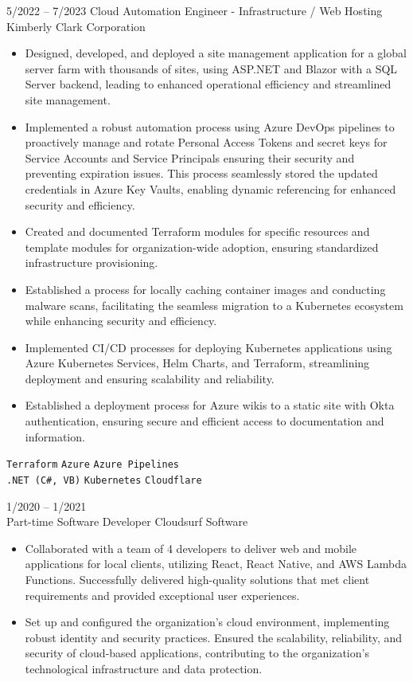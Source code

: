 \documentclass[9pt]{developercv} %
\begin{document}
\begin{entrylist}
	\entry
		{5/2022 -- 7/2023}
		{Cloud Automation Engineer - Infrastructure / Web Hosting}
		{Kimberly Clark Corporation}
		{\vspace{-10pt}
        \begin{itemize}[noitemsep,topsep=0pt,parsep=0pt,partopsep=0pt, leftmargin=-1pt]
            \item Designed, developed, and deployed a site management application for a global server farm with thousands of sites, using ASP.NET and Blazor with a SQL Server backend, leading to enhanced operational efficiency and streamlined site management.
            \item Implemented a robust automation process using Azure DevOps pipelines to proactively manage and rotate Personal Access Tokens and secret keys for Service Accounts and Service Principals ensuring their security and preventing expiration issues. This process seamlessly stored the updated credentials in Azure Key Vaults, enabling dynamic referencing for enhanced security and efficiency.
            \item Created and documented Terraform modules for specific resources and template modules for organization-wide adoption, ensuring standardized infrastructure provisioning.
            \item  Established a process for locally caching container images and conducting malware scans, facilitating the seamless migration to a Kubernetes ecosystem while enhancing security and efficiency.
            \item Implemented CI/CD processes for deploying Kubernetes applications using Azure Kubernetes Services, Helm Charts, and Terraform, streamlining deployment and ensuring scalability and reliability.
            \item Established a deployment process for Azure wikis to a static site with Okta authentication, ensuring secure and efficient access to documentation and information.
        \end{itemize} 
\vspace{1mm}
        \texttt{Terraform} \slashsep \texttt{Azure} \slashsep \texttt{Azure Pipelines} \\ \texttt{.NET (C\#, VB)} \slashsep \texttt{Kubernetes} \slashsep \texttt{Cloudflare}}
	\entry
		{1/2020 -- 1/2021 \\ \footnotesize{Part-time}}
		{Software Developer}
		{Cloudsurf Software}
		{\vspace{-10pt}
        \begin{itemize}[noitemsep,topsep=0pt,parsep=0pt,partopsep=0pt, leftmargin=-1pt]
\item Collaborated with a team of 4 developers to deliver web and mobile applications for local clients, utilizing React, React Native, and AWS Lambda Functions. Successfully delivered high-quality solutions that met client requirements and provided exceptional user experiences.
\item Set up and configured the organization's cloud environment, implementing robust identity and security practices. Ensured the scalability, reliability, and security of cloud-based applications, contributing to the organization's technological infrastructure and data protection.


\end{itemize}}
\end{entrylist}
\end{document}
